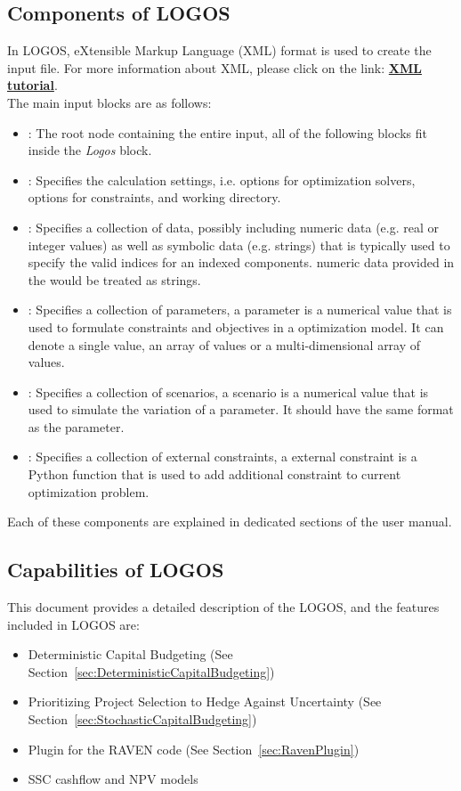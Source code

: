 \subsection{Components of LOGOS}
In LOGOS, eXtensible Markup Language (XML) format is used to create the input file. For more
information about XML, please click on the link:
\href{https://www.w3schools.com/xml/default.asp}{\textbf{XML tutorial}}.
%
\\The main input blocks are as follows:
\begin{itemize}
  \item {}: The root node containing the
  entire input, all of
  the following blocks fit inside the \emph{Logos} block.
  \item {}: Specifies the calculation settings, i.e. options for
	optimization solvers, options for constraints, and working directory.
  \item {}: Specifies a collection of data, possibly including
	numeric data (e.g. real or integer values) as well as symbolic data (e.g. strings)
	that is typically used to specify the valid indices for an indexed components.
	\nb numeric data provided in the  would be treated as strings.
	\item {}: Specifies a collection of parameters, a parameter
	is a numerical value that is used to formulate constraints and objectives in a
	optimization model. It can denote a single value, an array of values or a multi-dimensional
	array of values.
	\item {}: Specifies a collection of scenarios, a scenario is a
	numerical value that is used to simulate the variation of a parameter. It should have
	the same format as the parameter.
	\item {}: Specifies a collection of external constraints, a
	external constraint is a Python function that is used to add additional constraint to
	current optimization problem.
\end{itemize}

Each of these components are explained in dedicated sections of the user manual.

\subsection{Capabilities of LOGOS}
This document provides a detailed description of the LOGOS, and the features included in LOGOS are:
\begin{itemize}
	\item Deterministic Capital Budgeting (See Section~\ref{sec:DeterministicCapitalBudgeting})
	\item Prioritizing Project Selection to Hedge Against Uncertainty (See Section~\ref{sec:StochasticCapitalBudgeting})
	\item Plugin for the RAVEN code (See Section~\ref{sec:RavenPlugin})
	\item SSC cashflow and NPV models
\end{itemize}
